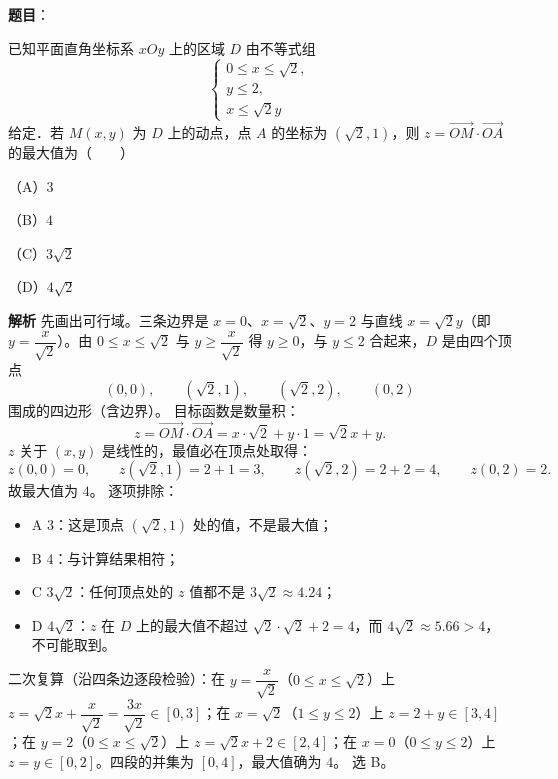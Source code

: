 \begin{answer}

\textbf{题目}：

已知平面直角坐标系 $xOy$ 上的区域 $D$ 由不等式组
\nopagebreak[4]
\[
\begin{cases}
0\leqslant x\leqslant\sqrt2,\\
y\leqslant2,\\
x\leqslant\sqrt2y
\end{cases}
\]
给定．若 $M(x,y)$ 为 $D$ 上的动点，点 $A$ 的坐标为 $(\sqrt2,1)$，则 $z=\overrightarrow{OM}\cdot\overrightarrow{OA}$ 的最大值为\mbox{（　　）}

（A）$3$

（B）$4$

（C）$3\sqrt2$

（D）$4\sqrt2$

\textbf{解析}
先画出可行域。三条边界是 $x=0$、$x=\sqrt2$、$y=2$ 与直线 $x=\sqrt2y$（即 $y=\dfrac{x}{\sqrt2}$）。由 $0\leqslant x\leqslant\sqrt2$ 与 $y\geqslant\dfrac{x}{\sqrt2}$ 得 $y\geqslant0$，与 $y\leqslant2$ 合起来，$D$ 是由四个顶点
\nopagebreak[4]
\[
(0,0),\qquad(\sqrt2,1),\qquad(\sqrt2,2),\qquad(0,2)
\]
围成的四边形（含边界）。
目标函数是数量积：
\nopagebreak[4]
\[
z=\overrightarrow{OM}\cdot\overrightarrow{OA}=x\cdot\sqrt2+y\cdot1=\sqrt2x+y.
\]
$z$ 关于 $(x,y)$ 是线性的，最值必在顶点处取得：
\nopagebreak[4]
\[
z(0,0)=0,\qquad z(\sqrt2,1)=2+1=3,\qquad z(\sqrt2,2)=2+2=4,\qquad z(0,2)=2.
\]
故最大值为 $4$。
逐项排除：
\begin{itemize}
\item A $3$：这是顶点 $(\sqrt2,1)$ 处的值，不是最大值；
\item B $4$：与计算结果相符；
\item C $3\sqrt2$：任何顶点处的 $z$ 值都不是 $3\sqrt2\approx4.24$；
\item D $4\sqrt2$：$z$ 在 $D$ 上的最大值不超过 $\sqrt2\cdot\sqrt2+2=4$，而 $4\sqrt2\approx5.66>4$，不可能取到。
\end{itemize}
二次复算（沿四条边逐段检验）：在 $y=\dfrac x{\sqrt2}$（$0\leqslant x\leqslant\sqrt2$）上 $z=\sqrt2x+\dfrac x{\sqrt2}=\dfrac{3x}{\sqrt2}\in[0,3]$；在 $x=\sqrt2$（$1\leqslant y\leqslant2$）上 $z=2+y\in[3,4]$；在 $y=2$（$0\leqslant x\leqslant\sqrt2$）上 $z=\sqrt2x+2\in[2,4]$；在 $x=0$（$0\leqslant y\leqslant2$）上 $z=y\in[0,2]$。四段的并集为 $[0,4]$，最大值确为 $4$。
选 B。


\end{answer}
